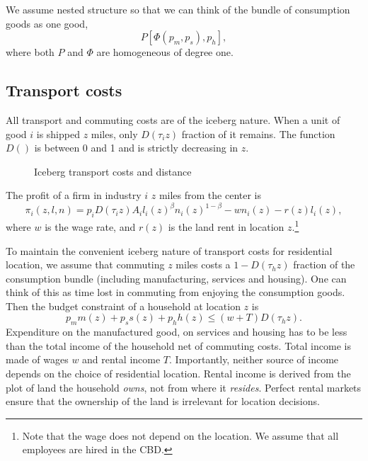 \documentclass[12pt]{article}
\begin{document}
We assume nested structure so that we can think of the bundle of consumption goods as one good,
    \[
    P[\Phi(p_m,p_s),p_h],
    \]
where both $P$ and $\Phi$ are homogeneous of degree one.

\subsection{Transport costs}
All transport and commuting costs are of the iceberg nature. When a unit of good $i$ is shipped $z$ miles, only $D(\tau_i z)$ fraction of it remains. The function $D()$ is between 0 and 1 and is strictly decreasing in $z$. 

\begin{figure}[h!]
\centering
  \vspace*{-1em}
  \caption{Iceberg transport costs and distance}\label{fig:Dz}
\end{figure}

The profit of a firm in industry $i$ $z$ miles from the center is
\[
\pi_i(z,l,n) = p_iD(\tau_i z)A_il_i(z)^\beta n_i(z)^{1-\beta} - wn_i(z) - r(z)l_i(z),
\]
where $w$ is the wage rate, and $r(z)$ is the land rent in location $z$.\footnote{Note that the wage does not depend on the location. We assume that all employees are hired in the CBD.}

To maintain the convenient iceberg nature of transport costs for residential location, we assume that commuting $z$ miles costs a $1-D(\tau_h z)$ fraction of the consumption bundle (including manufacturing, services and housing). One can think of this as time lost in commuting from enjoying the consumption goods. Then the budget constraint of a household at location $z$ is
\[
p_m m(z) + p_s s(z) + p_h h(z) \le (w+T)D(\tau_h z).
\]
Expenditure on the manufactured good, on services and housing has to be less than the total income of the household net of commuting costs. Total income is made of wages $w$ and rental income $T$. Importantly, neither source of income depends on the choice of residential location. Rental income is derived from the plot of land the household \emph{owns}, not from where it \emph{resides}. Perfect rental markets ensure that the ownership of the land is irrelevant for location decisions.
\end{document}
